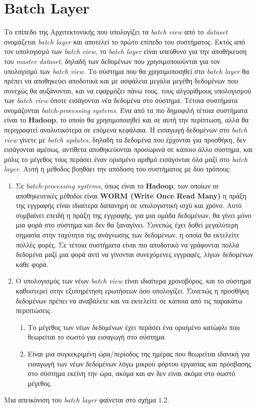 \section{Batch Layer}
Το επίπεδο της Αρχιτεκτονικής που υπολογίζει τα \textit{batch view} από το \textit{dataset} ονομάζεται \textit{batch layer} και αποτελεί το πρώτο επίπεδο του συστήματος. Εκτός από τον υπολογισμό των \textit{batch view}, το \textit{batch layer} είναι υπεύθυνο για την αποθήκευση του \textit{master dataset}, δηλαδή των δεδομένων που χρησιμοποιούνται για τον υπολογισμό των \textit{batch view}. Το σύστημα που θα χρησιμοποιηθεί στο \textit{batch layer} θα πρέπει να αποθηκεύει αποδοτικά και με ασφάλεια μεγάλα μεγέθη δεδομένων που συνεχώς θα αυξάνονται, και να εφαρμόζει πάνω τους, τους αλγορίθμους υπολογισμού των \textit{batch view} όποτε εισάγονται νέα δεδομένα στο σύστημα. Τέτοια συστήματα ονομάζονται \textit{batch-processing systems}. Ένα από τα πιο δημοφιλή τέτοια συστήματα είναι το \textbf{Hadoop}, το οποίο θα χρησιμοποιηθεί και σε αυτή την περίπτωση, αλλά θα περιγραφτεί αναλυτικότερα σε επόμενα κεφάλαια.
\newline
Η εισαγωγή δεδομένων στο \textit{batch view} γίνετε με \textit{batch updates}, δηλαδή τα δεδομένα που έρχονται για προσθήκη, δεν εισάγονται αμέσως, αντίθετα αποθηκεύονται προσωρινά σε κάποιο άλλο σύστημα, και μόλις το μέγεθος τους περάσει έναν ορισμένο αριθμό εισάγονται όλα μαζί στο \textit{batch layer}. Αυτή η μέθοδος βοηθάει την απόδοση του συστήματος με δύο τρόπους:
\begin{enumerate}
\item Σε \textit{batch-processing systems}, όπως είναι το \textbf{Hadoop}, των οποίων οι αποθηκευτικές μέθοδοι είναι \textbf{WORM (Write Once Read Many)} η πράξη της εγγραφής είναι ιδιαίτερα δαπανηρή σε υπολογιστική ισχύ και χρόνο. Αυτό συμβαίνει επειδή η πράξη της εγγραφής, για μια ομάδα δεδομένων, θα γίνει μόνο μια φορά στο σύστημα και δεν θα ξαναγίνει. Συνεπώς έχει δοθεί μεγαλύτερη σημασία στην ταχύτητα της ανάγνωσης των δεδομένων, η οποία θα εκτελείτε πολλές φορές. Σε τέτοια συστήματα είναι πιο αποδοτικό να γράφονται πολλά δεδομένα μαζί μια φορά αντί να γίνονται συνεχόμενες εγγραφές, λίγων δεδομένων κάθε φορά.
\item Ο υπολογισμός των νέων \textit{batch view} είναι ιδιαίτερα χρονοβόρος, και το σύστημα καθυστερεί στην εξυπηρέτηση ερωτήσεων όσο υπολογίζει. Συνεπώς η προσθήκη δεδομένων πρέπει να αναβάλετε και να εκτελείτε σε κάποια από τις παρακάτω περιπτώσεις:
\begin{enumerate}
\item Το μέγεθος των νέων δεδομένων έχει περάσει ένα ορισμένο κατώφλι που θεωρείται το σωστό για εισαγωγή στο σύστημα.
\item Είναι μια συγκεκριμένη ώρα/περίοδος της ημέρας που θεωρείται ιδανική για εισαγωγή των νέων δεδομένων λόγω μικρού φόρτου εργασίας και πρόσβασης στο σύστημα εκείνη την ώρα, ακόμα και αν δεν είναι ακόμα στο σωστό μέγεθος.
\end{enumerate}
\end{enumerate}
Μια απεικόνιση του \textit{batch layer} φαίνεται στο σχήμα 1.2.

